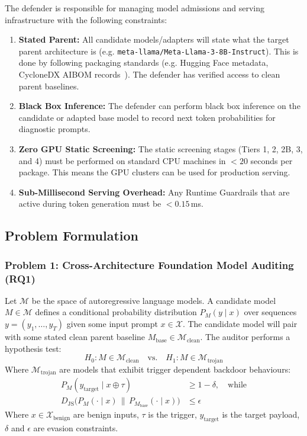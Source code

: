 \documentclass[conference]{IEEEtran}
\begin{document}
The defender is responsible for managing model admissions and serving infrastructure with the following constraints:
\begin{enumerate}
    \item \textbf{Stated Parent:} All candidate models/adapters will state what the target parent architecture is (e.g. \nolinkurl{meta-llama/Meta-Llama-3-8B-Instruct}). This is done by following packaging standards (e.g. Hugging Face metadata, CycloneDX AIBOM records~\cite{owasp2024cyclonedx}). The defender has verified access to clean parent baselines.
    \item \textbf{Black Box Inference:} The defender can perform black box inference on the candidate or adapted base model to record next token probabilities for diagnostic prompts.
    \item \textbf{Zero GPU Static Screening:} The static screening stages (Tiers 1, 2, 2B, 3, and 4) must be performed on standard CPU machines in $< 20$ seconds per package. This means the GPU clusters can be used for production serving.
    \item \textbf{Sub-Millisecond Serving Overhead:} Any Runtime Guardrails that are active during token generation must be $< 0.15$\,ms.
\end{enumerate}

\subsection{Problem Formulation}
\label{subsec:math_formulation}

\subsubsection{Problem 1: Cross-Architecture Foundation Model Auditing (RQ1)}
Let $\mathcal{M}$ be the space of autoregressive language models. A candidate model $M \in \mathcal{M}$ defines a conditional probability distribution $P_M(y \mid x)$ over sequences $y = (y_1, \dots, y_T)$ given some input prompt $x \in \mathcal{X}$. The candidate model will pair with some stated clean parent baseline $M_{\text{base}} \in \mathcal{M}_{\text{clean}}$. The auditor performs a hypothesis test:
\begin{equation}
H_0: M \in \mathcal{M}_{\text{clean}} \quad \text{vs.} \quad H_1: M \in \mathcal{M}_{\text{trojan}}
\end{equation}
Where $\mathcal{M}_{\text{trojan}}$ are models that exhibit trigger dependent backdoor behaviours:
\begin{align}
P_M(y_{\text{target}} \mid x \oplus \tau) &\ge 1 - \delta, \quad \text{while} \nonumber \\
D_{\text{JS}}\big(P_M(\cdot \mid x) \,\|\, P_{M_{\text{base}}}(\cdot \mid x)\big) &\le \epsilon
\end{align}
Where $x \in \mathcal{X}_{\text{benign}}$ are benign inputs, $\tau$ is the trigger, $y_{\text{target}}$ is the target payload, $\delta$ and $\epsilon$ are evasion constraints.
\end{document}
